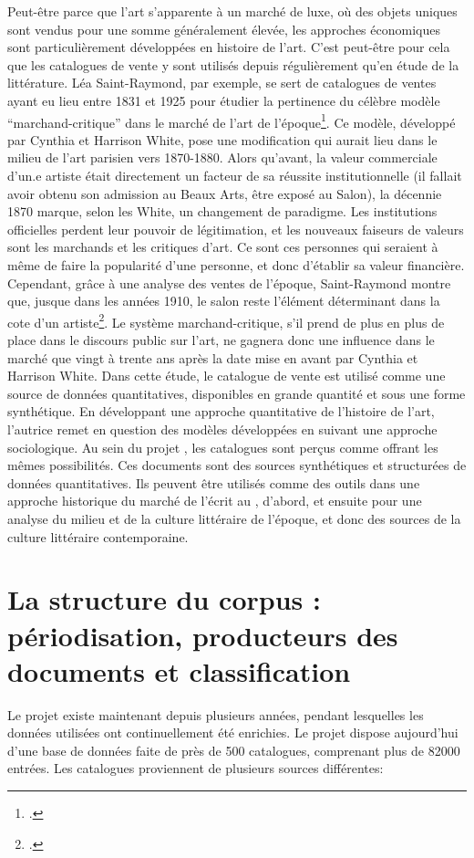 Peut-être parce que l'art s'apparente à un marché de luxe, où des objets uniques sont vendus pour une somme généralement élevée, les approches économiques sont particulièrement développées en histoire de l'art. C'est peut-être pour cela que les catalogues de vente y sont utilisés depuis régulièrement qu'en étude de la littérature. Léa Saint-Raymond, par exemple, se sert de catalogues de ventes ayant eu lieu entre 1831 et 1925 pour étudier la pertinence du célèbre modèle \enquote{marchand-critique} dans le marché de l'art de l'époque\footcite{saint-raymond_revisiting_2019}. Ce modèle, développé par Cynthia et Harrison White, pose une modification qui aurait lieu dans le milieu de l'art parisien vers 1870-1880. Alors qu'avant, la valeur commerciale d'un.e artiste était directement un facteur de sa réussite institutionnelle (il fallait avoir obtenu son admission au Beaux Arts, être exposé au Salon), la décennie 1870 marque, selon les White, un changement de paradigme. Les institutions officielles perdent leur pouvoir de légitimation, et les nouveaux faiseurs de valeurs sont les marchands et les critiques d'art. Ce sont ces personnes qui seraient à même de faire la popularité d'une personne, et donc d'établir sa valeur financière. Cependant, grâce à une analyse des ventes de l'époque, Saint-Raymond montre que, jusque dans les années 1910, le salon reste l'élément déterminant dans la cote d'un artiste\footcite[p. 6-16]{saint-raymond_revisiting_2019}. Le système marchand-critique, s'il prend de plus en plus de place dans le discours public sur l'art, ne gagnera donc une influence dans le marché que vingt à trente ans après la date mise en avant par Cynthia et Harrison White. Dans cette étude, le catalogue de vente est utilisé comme une source de données quantitatives, disponibles en grande quantité et sous une forme synthétique. En développant une approche quantitative de l'histoire de l'art, l'autrice remet en question des modèles développées en suivant une approche sociologique. Au sein du projet \mssktb{}, les catalogues sont perçus comme offrant les mêmes possibilités. Ces documents sont des sources synthétiques et structurées de données quantitatives. Ils peuvent être utilisés comme des outils dans une approche historique du marché de l'écrit au , d'abord, et ensuite pour une analyse du milieu et de la culture littéraire de l'époque, et donc des sources de la culture littéraire contemporaine.


\section{La structure du corpus : périodisation, producteurs des documents et classification}
Le projet \mssktb{} existe maintenant depuis plusieurs années, pendant lesquelles les données utilisées ont continuellement été enrichies. Le projet dispose aujourd'hui d'une base de données faite de près de 500 catalogues, comprenant plus de 82000 entrées. Les catalogues proviennent de plusieurs sources différentes:

